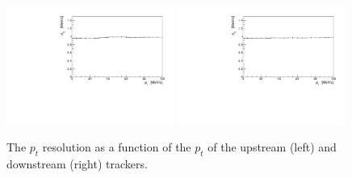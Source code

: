   
  \begin{figure}[p]
   \begin{center}
     \includegraphics[width=0.49\textwidth, angle=0]{08-Performance/upstream_pt_resolution_pt.pdf}
     \includegraphics[width=0.49\textwidth, angle=0]{08-Performance/downstream_pt_resolution_pt.pdf}
     \caption{\label{fig:PtPtResolKalman} The $p_{t}$ resolution as a function of the $p_{t}$ of the upstream (left) and downstream (right) trackers.}
   \end{center}
  \end{figure}
  
